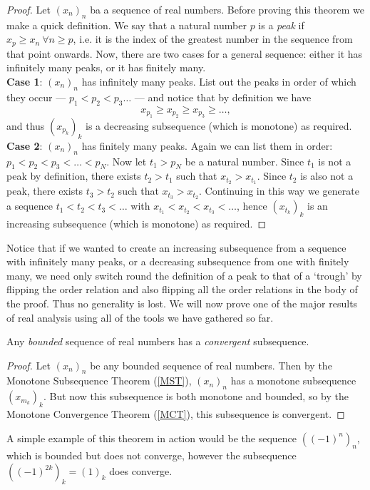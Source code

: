\documentclass[../real_analysis.tex]{subfiles}
\begin{document}
        \begin{proof}
            Let $(x_n)_n$ ba a sequence of real numbers. Before proving this theorem we make a quick definition. We say that a natural number $p$ is a \textit{peak} if $x_p\geq x_n\ \forall n\geq p$, i.e. it is the index of the greatest number in the sequence from that point onwards. Now, there are two cases for a general sequence: either it has infinitely many peaks, or it has finitely many.\\
            \textbf{Case 1}: $(x_n)_n$ has infinitely many peaks. List out the peaks in order of which they occur --- $p_1<p_2<p_3\dots$ --- and notice that by definition we have
            \begin{equation*}
                x_{p_1}\geq x_{p_2}\geq x_{p_3}\geq\dots,
            \end{equation*}
            and thus $(x_{p_k})_k$ is a decreasing subsequence (which is monotone) as required.\\
            \textbf{Case 2}: $(x_n)_n$ has finitely many peaks. Again we can list them in order: $p_1<p_2<p_3<\dots<p_N$. Now let $t_1>p_N$ be a natural number. Since $t_1$ is not a peak by definition, there exists $t_2>t_1$ such that $x_{t_2}>x_{t_1}$. Since $t_2$ is also not a peak, there exists $t_3>t_2$ such that $x_{t_3}>x_{t_2}$. Continuing in this way we generate a sequence $t_1<t_2<t_3<\dots$ with $x_{t_1}<x_{t_2}<x_{t_3}<\dots$, hence $(x_{t_k})_k$ is an increasing subsequence (which is monotone) as required.
        \end{proof}
        Notice that if we wanted to create an increasing subsequence from a sequence with infinitely many peaks, or a decreasing subsequence from one with finitely many, we need only switch round the definition of a peak to that of a `trough' by flipping the order relation and also flipping all the order relations in the body of the proof. Thus no generality is lost. We will now prove one of the major results of real analysis using all of the tools we have gathered so far.
        \begin{theorem}\label{BWT}
            Any \textit{bounded} sequence of real numbers has a \textit{convergent} subsequence.
        \end{theorem}
        \begin{proof}
            Let $(x_n)_n$ be any bounded sequence of real numbers. Then by the Monotone Subsequence Theorem (\ref{MST}), $(x_n)_n$ has a monotone subsequence $(x_{m_k})_k$. But now this subsequence is both monotone and bounded, so by the Monotone Convergence Theorem (\ref{MCT}), this subsequence is convergent.
        \end{proof}
        A simple example of this theorem in action would be the sequence $((-1)^n)_n$, which is bounded but does not converge, however the subsequence $((-1)^{2k})_k=(1)_k$ does converge.
\end{document}

